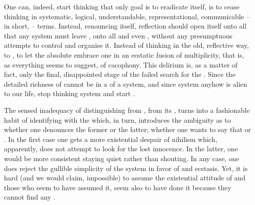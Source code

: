 One can, indeed, start thinking that  only goal is to eradicate
itself, is to cease thinking in systematic, logical, understandable, representational,
communicable -- in short,  -- terms.  Instead, renouncing itself,
reflection should open itself onto all that any system must leave ,
onto all  and even , without any
presumptuous attempts
to control and organise it. Instead of thinking in the old, reflective way, to
, to let the absolute  embrace one in an ecstatic
fusion of multiplicity, that is, as everything seems to suggest, of cacophony.
This delirium is, as a matter of fact, only the final, disappointed stage of the
failed search for the
. Since the detailed richness of  cannot be
 in a  of a system, and since system anyhow is
alien to our 
life, stop thinking system and start .

\pa 
The sensed inadequacy of distinguishing  from ,
 from its , turns into a fashionable habit of identifying
 with  
the  which, in turn, introduces the ambiguity as to whether one 
denounces the former or the latter; whether one wants to say that  or . In the first 
case one gets a more existential despair of nihilism which, apparently, does not 
attempt to look for the lost innocence. 
In the latter, one would be more consistent staying quiet rather than
shouting. In any case, one does reject 
the gullible simplicity of the system in favor of  and 
 ecstasis. Yet, it is hard (and we would claim, impossible)
to assume the existential 
attitude of  and those who seem to have assumed it, seem
also to have done it because they cannot find any .


